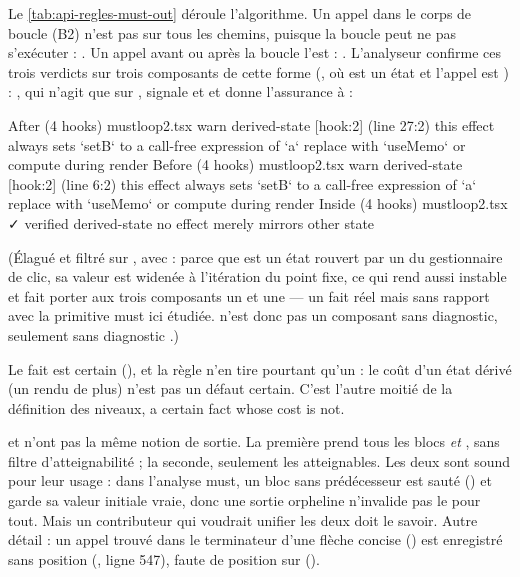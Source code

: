 Le \cref{tab:api-regles-must-out} déroule l'algorithme. Un appel dans le corps de boucle (B2) n'est pas sur tous les chemins, puisque la boucle peut ne pas s'exécuter : . Un appel avant ou après la boucle l'est : . L'analyseur confirme ces trois verdicts sur trois composants de cette forme (, où  est un état et l'appel est ) : , qui n'agit que sur , signale  et  et donne l'assurance  à  :

\begin{sortie}
  After  (4 hooks)  mustloop2.tsx
    warn   derived-state  [hook:2]  (line 27:2)  this effect always sets `setB` to a call-free expression of `a` replace with `useMemo` or compute during render
  Before  (4 hooks)  mustloop2.tsx
    warn   derived-state  [hook:2]  (line 6:2)  this effect always sets `setB` to a call-free expression of `a` replace with `useMemo` or compute during render
  Inside  (4 hooks)  mustloop2.tsx  ✓
    verified  derived-state  no effect merely mirrors other state
\end{sortie}

(Élagué et filtré sur , avec  : parce que  est un état rouvert par un  du gestionnaire de clic, sa valeur est widenée à l'itération du point fixe, ce qui rend aussi  instable et fait porter aux trois composants un \Warning{}  et une \Info{}  --- un fait réel mais sans rapport avec la primitive must ici étudiée.  n'est donc pas un composant sans diagnostic, seulement sans diagnostic .)

Le fait est certain (), et la règle n'en tire pourtant qu'un \Warning{} : le coût d'un état dérivé (un rendu de plus) n'est pas un défaut certain. C'est l'autre moitié de la définition des niveaux, \og a certain fact whose cost is not\fg.

\begin{piege}
 et  n'ont pas la même notion de \og sortie\fg. La première prend tous les blocs  \emph{et} , sans filtre d'atteignabilité ; la seconde, seulement les  atteignables. Les deux sont sound pour leur usage : dans l'analyse must, un bloc sans prédécesseur est sauté () et garde sa valeur initiale vraie, donc une sortie orpheline n'invalide pas le \og pour tout\fg. Mais un contributeur qui voudrait unifier les deux doit le savoir. Autre détail : un appel trouvé dans le terminateur  d'une flèche concise () est enregistré sans position (, ligne 547), faute de position sur  ().
\end{piege}

